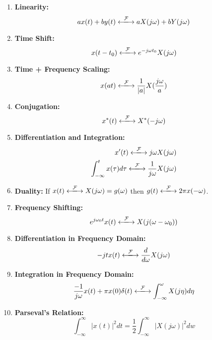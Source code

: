 \documentclass[a4paper,12pt]{report}
\def\fft{\xlongleftrightarrow{\mathcal{F}}}
\begin{document}
\begin{enumerate}
\item \textbf{Linearity: } \begin{equation}
ax(t) + by(t) \fft aX(j\omega) + bY(j\omega)
\end{equation}

\item \textbf{Time Shift: } \begin{equation}
x(t-t_0) \fft e^{-j\omega t_0} X(j\omega)
\end{equation}

\item \textbf{Time + Frequency Scaling: } \begin{equation}
x(at) \fft \frac{1}{|a|} X(\frac{j\omega}{a})
\end{equation}

\item \textbf{Conjugation: } \begin{equation}
x^*(t) \fft X^*(-j\omega)
\end{equation}

\item \textbf{Differentiation and Integration: } 
\begin{align}
x'(t) \fft j\omega X(j\omega) \\
\int_{-\infty}^{t} x(\tau) d\tau \fft \frac{1}{j\omega} X(j\omega)
\end{align}

\item \textbf{Duality: } If $x(t) \fft X(j\omega) = g(\omega)$ then $g(t) \fft 2\pi x(-\omega)$.

\item \textbf{Frequency Shifting: } \begin{equation}
e^{j\omega_0 t} x(t) \fft X(j(\omega-\omega_0))
\end{equation}


\item \textbf{Differentiation in Frequency Domain: } \begin{equation}
-jtx(t) \fft \frac{d}{d\omega} X(j\omega)
\end{equation}



\item \textbf{Integration in Frequency Domain: } \begin{equation}
\frac{-1}{j\omega} x(t) + \pi x(0) \delta(t) \fft \int_{-\infty}^{\omega} X(j\eta) d\eta
\end{equation}

\item \textbf{Parseval's Relation: } \begin{equation}
\int_{-\infty}^{\infty} |x(t)|^2 dt = \frac{1}{2} \int_{-\infty}^{\infty} |X(j\omega)|^2 dw
\end{equation}

\end{enumerate}
\end{document}
